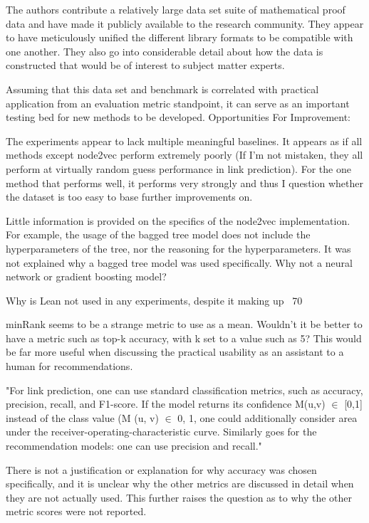 \documentclass{article}
\begin{document}
The authors contribute a relatively large data set suite of mathematical proof data and have made it publicly available to the research community. They appear to have meticulously unified the different library formats to be compatible with one another. They also go into considerable detail about how the data is constructed that would be of interest to subject matter experts.

Assuming that this data set and benchmark is correlated with practical application from an evaluation metric standpoint, it can serve as an important testing bed for new methods to be developed.
Opportunities For Improvement:

The experiments appear to lack multiple meaningful baselines. It appears as if all methods except node2vec perform extremely poorly (If I'm not mistaken, they all perform at virtually random guess performance in link prediction). For the one method that performs well, it performs very strongly and thus I question whether the dataset is too easy to base further improvements on.

Little information is provided on the specifics of the node2vec implementation. For example, the usage of the bagged tree model does not include the hyperparameters of the tree, nor the reasoning for the hyperparameters. It was not explained why a bagged tree model was used specifically. Why not a neural network or gradient boosting model?

Why is Lean not used in any experiments, despite it making up ~70%

minRank seems to be a strange metric to use as a mean. Wouldn't it be better to have a metric such as top-k accuracy, with k set to a value such as 5? This would be far more useful when discussing the practical usability as an assistant to a human for recommendations.

"For link prediction, one can use standard classification metrics, such as accuracy, precision, recall, and F1-score. If the model returns its confidence M(u,v) $\in$ [0,1] instead of the class value (M (u, v) $\in$ {0, 1}, one could additionally consider area under the receiver-operating-characteristic curve. Similarly goes for the recommendation models: one can use precision and recall."

    There is not a justification or explanation for why accuracy was chosen specifically, and it is unclear why the other metrics are discussed in detail when they are not actually used. This further raises the question as to why the other metric scores were not reported.
\end{document}
